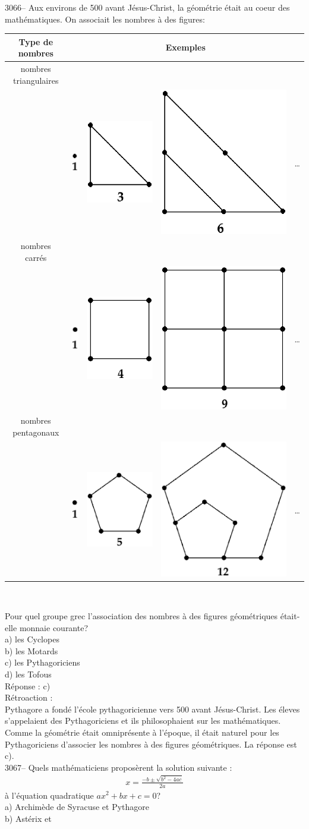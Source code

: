 \documentclass[letterpaper, 12pt]{article}
\begin{document}
3066-- Aux environs de 500 avant J\'esus-Christ, la g\'eom\'etrie \'etait au coeur des math\'ematiques. On associait les nombres \`a des figures:
\begin{center}
\begin{tabular}{|c|c|c|c|c|} \hline
{\bf Type de nombres} & \multicolumn{4}{c|}{\bf Exemples}\\[2mm] \hline
nombres triangulaires& & & & \\
& \includegraphics[scale=0.2]{nbtriangle1.eps} & \includegraphics[scale=0.2]{nbtriangle3.eps} & \includegraphics[scale=0.2]{nbtriangle6.eps} & \dots\\[2mm] \hline
nombres carr\'es & & & & \\
& \includegraphics[scale=0.2]{nbcarre1.eps} & \includegraphics[scale=0.2]{nbcarre4.eps} & \includegraphics[scale=0.2]{nbcarre9.eps} & \dots\\[2mm] \hline
nombres pentagonaux & & & & \\
& \includegraphics[scale=0.2]{nbpenta1.eps} & \includegraphics[scale=0.2]{nbpenta5.eps} & \includegraphics[scale=0.2]{nbpenta12.eps} & \dots\\[2mm] \hline
\end{tabular}\\
\end{center}
Pour quel groupe grec l'association des nombres \`a des figures g\'eom\'etriques \'etait-elle monnaie courante?\\

a) les Cyclopes\\
b) les Motards\\
c) les Pythagoriciens\\
d) les Tofous\\

R\'eponse : c)\\

R\'etroaction :\\
Pythagore a fond\'e l'\'ecole pythagoricienne vers 500 avant J\'esus-Christ. Les \'eleves s'appelaient des Pythagoriciens et ils philosophaient sur les math\'ematiques. Comme la g\'eom\'etrie \'etait omnipr\'esente \`a l'\'epoque, il \'etait naturel pour les Pythagoriciens d'associer les nombres \`a des figures g\'eom\'etriques. La r\'eponse est c).\\



3067-- Quels math\'ematiciens propos\`erent la solution suivante :
\begin{eqnarray*}
x = \frac{-b \pm \sqrt{b^{2} - 4ac}}{2a}
\end{eqnarray*}
\`a l'\'equation quadratique $ax^{2} + bx + c = 0$?\\

a) Archim\`ede de Syracuse et Pythagore\\
b) Ast\'erix et 
\end{document}
